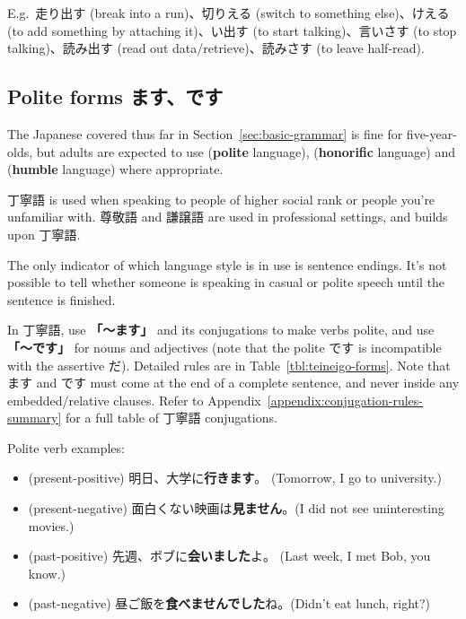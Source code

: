 \documentclass[../nihongo-gakushuu-kyouzai.tex]{subfiles}
\begin{document}
E.g.\ 走り出す (break into a run)、切りえる (switch to something else)、けえる (to add something by attaching it)、い出す (to start talking)、言いさす (to stop talking)、読み出す (read out data/retrieve)、読みさす (to leave half-read).


\subsection{Polite forms ます、です}

The Japanese covered thus far in Section~\ref{sec:basic-grammar} is fine for five-year-olds, but adults are expected to use  (\textbf{polite} language),  (\textbf{honorific} language) and  (\textbf{humble} language) where appropriate.

丁寧語 is used when speaking to people of higher social rank or people you're unfamiliar with. 尊敬語 and 謙譲語 are used in professional settings, and builds upon 丁寧語.

The only indicator of which language style is in use is sentence endings. It's not possible to tell whether someone is speaking in casual or polite speech until the sentence is finished.

In 丁寧語, use \textbf{「〜ます」} and its conjugations to make verbs polite, and use \textbf{「〜です」} for nouns and adjectives (note that the polite です is incompatible with the assertive だ). Detailed rules are in Table~\ref{tbl:teineigo-forms}. Note that ます and です must come at the end of a complete sentence, and never inside any embedded/relative clauses. Refer to Appendix~\ref{appendix:conjugation-rules-summary} for a full table of 丁寧語 conjugations.

Polite verb examples:
\begin{itemize}
    \item (present-positive) 明日、大学に\textbf{行きます}。 (Tomorrow, I go to university.)
    \item (present-negative) 面白くない映画は\textbf{見ません}。(I did not see uninteresting movies.)
    \item (past-positive) 先週、ボブに\textbf{会いました}よ。 (Last week, I met Bob, you know.)
    \item (past-negative) 昼ご飯を\textbf{食べませんでした}ね。(Didn't eat lunch, right?)
\end{itemize}
\end{document}
